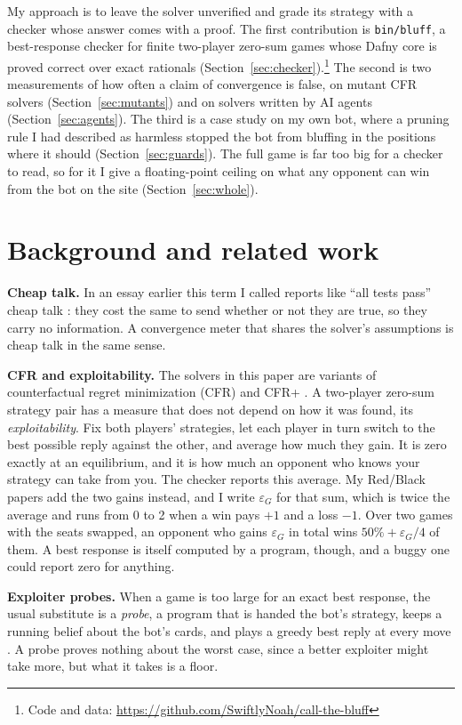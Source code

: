 \documentclass[11pt]{article}
\newcommand{\code}[1]{\texttt{\small #1}}
\begin{document}
My approach is to leave the solver unverified and grade its strategy with a checker whose answer
comes with a proof. The first contribution is \code{bin/bluff}, a best-response checker for finite
two-player zero-sum games whose Dafny core is proved correct over exact rationals
(Section~\ref{sec:checker}).\footnote{Code and data: \url{https://github.com/SwiftlyNoah/call-the-bluff}}
The second is two measurements of how often a claim of convergence is false, on mutant CFR solvers
(Section~\ref{sec:mutants}) and on solvers written by AI agents (Section~\ref{sec:agents}). The
third is a case study on my own bot, where a pruning rule I had described as harmless stopped the
bot from bluffing in the positions where it should (Section~\ref{sec:guards}). The full game is far
too big for a checker to read, so for it I give a floating-point ceiling on what any opponent can
win from the bot on the site (Section~\ref{sec:whole}).

\section{Background and related work}

\textbf{Cheap talk.} In an essay earlier this term I called reports like ``all tests pass'' cheap
talk \cite{essay,crawford1982}: they cost the same to send whether or not they are true, so they
carry no information. A convergence meter that shares the solver's
assumptions is cheap talk in the same sense.

\textbf{CFR and exploitability.} The solvers in this paper are variants of counterfactual regret
minimization (CFR) \cite{zinkevich2007} and CFR+ \cite{tammelin2014}. A two-player zero-sum
strategy pair has a measure that does not depend on how it was found, its \emph{exploitability}. Fix both players'
strategies, let each player in turn switch to the best possible reply against the other, and
average how much they gain. It is zero exactly at an equilibrium, and it is how much an opponent who knows your strategy can take from you. The checker reports this
average. My Red/Black papers add the two gains instead, and I write $\varepsilon_G$ for that sum,
which is twice the average and runs from 0 to 2 when a win pays $+1$ and a loss $-1$. Over two
games with the seats swapped, an opponent who gains $\varepsilon_G$ in total wins
$50\%+\varepsilon_G/4$ of them. A best response is itself computed by a program, though,
and a buggy one could report zero for anything.

\textbf{Exploiter probes.} When a game is too large for an exact best response, the usual
substitute is a \emph{probe}, a program that is handed the bot's strategy, keeps a running belief
about the bot's cards, and plays a greedy best reply at every move \cite{lisy2017}. A probe proves
nothing about the worst case, since a better exploiter might take more, but what it takes is a
floor.
\end{document}
